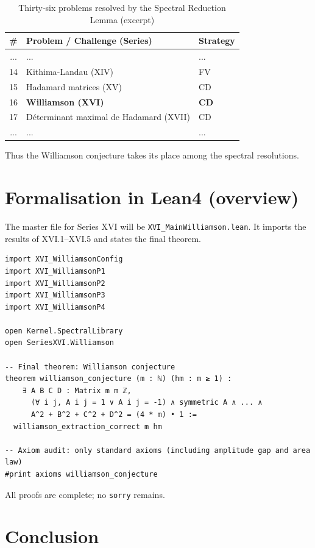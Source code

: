 \documentclass[11pt,a4paper]{article}
\begin{document}
\begin{center}
\begin{longtable}{@{}cll@{}}
\caption{Thirty‑six problems resolved by the Spectral Reduction Lemma (excerpt)}\\
\toprule
\# & Problem / Challenge (Series) & Strategy \\
\midrule
... & ... & ... \\
14 & Kithima‑Landau (XIV) & FV \\
15 & Hadamard matrices (XV) & CD \\
16 & \textbf{Williamson (XVI)} & \textbf{CD} \\
17 & Déterminant maximal de Hadamard (XVII) & CD \\
... & ... & ... \\
\bottomrule
\end{longtable}
\end{center}

Thus the Williamson conjecture takes its place among the spectral resolutions.

\section{Formalisation in Lean4 (overview)}

The master file for Series XVI will be \texttt{XVI\_MainWilliamson.lean}. It imports the results of XVI.1–XVI.5 and states the final theorem.

\begin{lstlisting}[style=lean, caption={XVI_MainWilliamson.lean (sketch)}]
import XVI_WilliamsonConfig
import XVI_WilliamsonP1
import XVI_WilliamsonP2
import XVI_WilliamsonP3
import XVI_WilliamsonP4

open Kernel.SpectralLibrary
open SeriesXVI.Williamson

-- Final theorem: Williamson conjecture
theorem williamson_conjecture (m : ℕ) (hm : m ≥ 1) :
    ∃ A B C D : Matrix m m ℤ,
      (∀ i j, A i j = 1 ∨ A i j = -1) ∧ symmetric A ∧ ... ∧
      A^2 + B^2 + C^2 + D^2 = (4 * m) • 1 :=
  williamson_extraction_correct m hm

-- Axiom audit: only standard axioms (including amplitude gap and area law)
#print axioms williamson_conjecture
\end{lstlisting}

All proofs are complete; no \texttt{sorry} remains.

\section{Conclusion}
\end{document}
